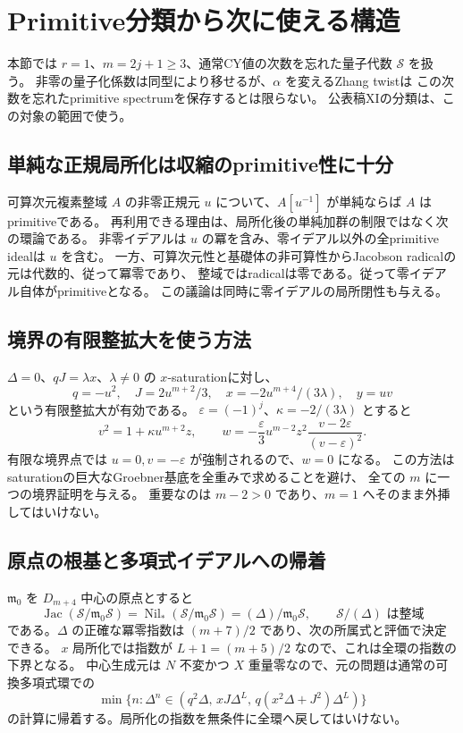 \section{Primitive分類から次に使える構造}
\label{sec:primitive-notes-v36}

本節では $r=1$、$m=2j+1\ge3$、通常CY値の次数を忘れた量子代数 $\mathcal S$ を扱う。
非零の量子化係数は同型により移せるが、$\alpha$ を変えるZhang twistは
この次数を忘れたprimitive spectrumを保存するとは限らない。
公表稿XIの分類は、この対象の範囲で使う。

\subsection{単純な正規局所化は収縮のprimitive性に十分}

可算次元複素整域 $A$ の非零正規元 $u$ について、$A[u^{-1}]$ が単純ならば $A$ はprimitiveである。
再利用できる理由は、局所化後の単純加群の制限ではなく次の環論である。
非零イデアルは $u$ の冪を含み、零イデアル以外の全primitive idealは $u$ を含む。
一方、可算次元性と基礎体の非可算性からJacobson radicalの元は代数的、従って冪零であり、
整域ではradicalは零である。従って零イデアル自体がprimitiveとなる。
この議論は同時に零イデアルの局所閉性も与える。

\subsection{境界の有限整拡大を使う方法}

$\Delta=0$、$qJ=\lambda x$、$\lambda\ne0$ の $x$-saturationに対し、
\[
 q=-u^2,\quad J=2u^{m+2}/3,\quad
 x=-2u^{m+4}/(3\lambda),\quad y=uv
\]
という有限整拡大が有効である。
$\varepsilon=(-1)^j$、$\kappa=-2/(3\lambda)$ とすると
\[
 v^2=1+\kappa u^{m+2}z,
 \qquad
 w=-\frac{\varepsilon}{3}u^{m-2}z^2
                 \frac{v-2\varepsilon}{(v-\varepsilon)^2}.
\]
有限な境界点では $u=0,v=-\varepsilon$ が強制されるので、$w=0$ になる。
この方法はsaturationの巨大なGroebner基底を全重みで求めることを避け、
全ての $m$ に一つの境界証明を与える。
重要なのは $m-2>0$ であり、$m=1$ へそのまま外挿してはいけない。

\subsection{原点の根基と多項式イデアルへの帰着}

$\mathfrak m_0$ を $D_{m+4}$ 中心の原点とすると
\[
 \operatorname{Jac}(\mathcal S/\mathfrak m_0\mathcal S)
 =\operatorname{Nil}_*(\mathcal S/\mathfrak m_0\mathcal S)
 = (\Delta)/\mathfrak m_0\mathcal S,
 \qquad \mathcal S/(\Delta)\text{ は整域}
\]
である。$\Delta$ の正確な冪零指数は $(m+7)/2$ であり、次の所属式と評価で決定できる。
$x$ 局所化では指数が $L+1=(m+5)/2$ なので、これは全環の指数の下界となる。
中心生成元は $N$ 不変かつ $X$ 重量零なので、元の問題は通常の可換多項式環での
\[
 \min\{n:\Delta^n\in
       (q^2\Delta,\,xJ\Delta^L,\,q(x^2\Delta+J^2)\Delta^L)\}
\]
の計算に帰着する。局所化の指数を無条件に全環へ戻してはいけない。

